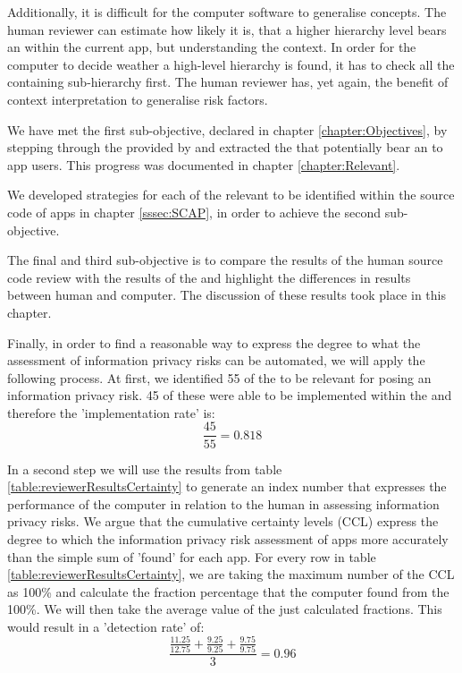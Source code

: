 Additionally, it is difficult for the computer software to generalise concepts.
The human reviewer can estimate how likely it is, that a higher hierarchy level \ipp bears an \ipr within the current app, but understanding the context.
In order for the computer to decide weather a high-level hierarchy is found, it has to check all the containing sub-hierarchy \ipp first.
The human reviewer has, yet again, the benefit of context interpretation to generalise risk factors.

We have met the first sub-objective, declared in chapter \ref{chapter:Objectives}, by stepping through the \ipp provided by \textcite{Dehling2016} and extracted the \ipp that potentially bear an \ipr to \mH app users.
This progress was documented in chapter \ref{chapter:Relevant}.

We developed strategies for each of the relevant \ipp to be identified within the source code of \mH apps in chapter \ref{sssec:SCAP}, in order to achieve the second sub-objective.

The final and third sub-objective is to compare the results of the human source code review with the results of the \aiprat and highlight the differences in results between human and computer.
The discussion of these results took place in this chapter.

Finally, in order to find a reasonable way to express the degree to what the assessment of information privacy risks can be automated, we will apply the following process.
At first, we identified 55 of the \ipp to be relevant for posing an information privacy risk. 
45 of these \ipp were able to be implemented within the \aiprat and therefore the 'implementation rate' is:
\begin{equation}
	\frac{45}{55}=0.818
\end{equation}

In a second step we will use the results from table \ref{table:reviewerResultsCertainty} to generate an index number that expresses the performance of the computer in relation to the human in assessing information privacy risks.
We argue that the cumulative certainty levels (CCL) express the degree to which  the information privacy risk assessment of \mH apps more accurately than the simple sum of 'found' \ipp for each app.
For every row in table \ref{table:reviewerResultsCertainty}, we are taking the maximum number of the CCL as 100\% and calculate the fraction percentage that the computer found from the 100\%.
We will then take the average value of the just calculated fractions.
This would result in a 'detection rate' of:
\begin{equation}
	\frac{\frac{11.25}{12.75} + \frac{9.25}{9.25} + \frac{9.75}{9.75}}{3} = 0.96
\end{equation}

